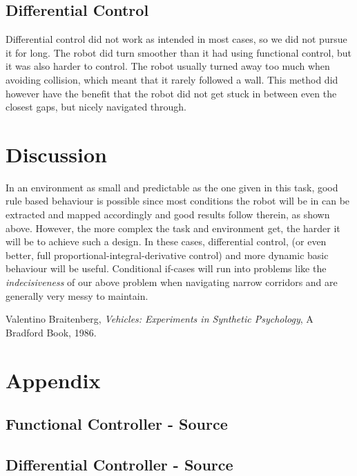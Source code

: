 \documentclass[paper=a4, fontsize=12pt]{scrartcl}	%
\numberwithin{equation}{section}		%
\numberwithin{figure}{section}			%
\numberwithin{table}{section}				%
\begin{document}
\subsection{Differential Control}
Differential control did not work as intended in most cases, so we did not pursue it for long. The robot did turn smoother than it had using functional control, but it was also harder to control. The robot usually turned away too much when avoiding collision, which meant that it rarely followed a wall. This method did however have the benefit that the robot did not get stuck in between even the closest gaps, but nicely navigated through.
\section{Discussion}
In an environment as small and predictable as the one given in this task, good rule based behaviour is possible since most conditions the robot will be in can be extracted and mapped accordingly and good results follow therein, as shown above. However, the more complex the task and environment get, the harder it will be to achieve such a design. In these cases, differential control, (or even better, full proportional-integral-derivative control) and more dynamic basic behaviour will be useful. Conditional if-cases will run into problems like the \emph{indecisiveness} of our above problem when navigating narrow corridors and are generally very messy to maintain.
\begin{thebibliography}{9}
  Valentino Braitenberg,
  \emph{Vehicles: Experiments in Synthetic Psychology},
  A Bradford Book,
  1986.
\end{thebibliography}
\section{Appendix}
\subsection{Functional Controller - Source}

\subsection{Differential Controller - Source}



\end{document}
